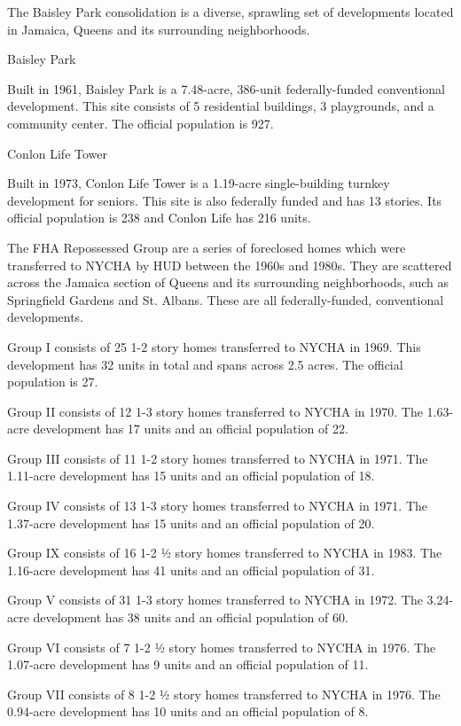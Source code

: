 

The Baisley Park consolidation is a diverse, sprawling set of developments located in Jamaica, Queens and its surrounding neighborhoods. 

Baisley Park 

Built in 1961, Baisley Park is a 7.48-acre, 386-unit federally-funded conventional development. This site consists of 5 residential buildings, 3 playgrounds, and a community center. The official population is 927. 

Conlon Life Tower 

Built in 1973, Conlon Life Tower is a 1.19-acre single-building turnkey development for seniors. This site is also federally funded and has 13 stories. Its official population is 238 and Conlon Life has 216 units. 

The FHA Repossessed Group are a series of foreclosed homes which were transferred to NYCHA by HUD between the 1960s and 1980s. They are scattered across the Jamaica section of Queens and its surrounding neighborhoods, such as Springfield Gardens and St. Albans. These are all federally-funded, conventional developments. 

Group I consists of 25 1-2 story homes transferred to NYCHA in 1969. This development has 32 units in total and spans across 2.5 acres. The official population is 27. 

Group II consists of 12 1-3 story homes transferred to NYCHA in 1970. The 1.63-acre development has 17 units and an official population of 22. 

Group III consists of 11 1-2 story homes transferred to NYCHA in 1971. The 1.11-acre development has 15 units and an official population of 18. 

Group IV consists of 13 1-3 story homes transferred to NYCHA in 1971. The 1.37-acre development has 15 units and an official population of 20. 

Group IX consists of 16 1-2 ½ story homes transferred to NYCHA in 1983. The 1.16-acre development has 41 units and an official population of 31. 

Group V consists of 31 1-3 story homes transferred to NYCHA in 1972. The 3.24-acre development has 38 units and an official population of 60. 

Group VI consists of 7 1-2 ½ story homes transferred to NYCHA in 1976. The 1.07-acre development has 9 units and an official population of 11. 

Group VII consists of 8 1-2 ½ story homes transferred to NYCHA in 1976. The 0.94-acre development has 10 units and an official population of 8.

